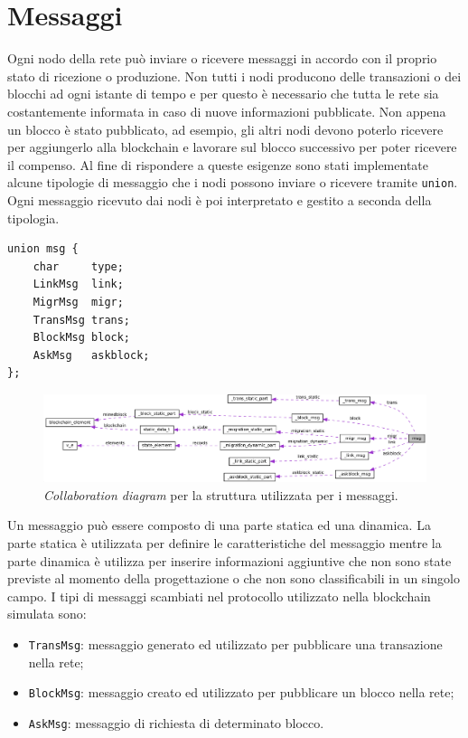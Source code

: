 \section{Messaggi}
Ogni nodo della rete può inviare o ricevere messaggi in accordo con il proprio stato di ricezione o produzione. Non tutti i nodi producono delle transazioni o dei blocchi ad ogni istante di tempo e per questo è necessario che tutta le rete sia costantemente informata in caso di nuove informazioni pubblicate. Non appena un blocco è stato pubblicato, ad esempio, gli altri nodi devono poterlo ricevere per aggiungerlo alla blockchain e lavorare sul blocco successivo per poter ricevere il compenso. Al fine di rispondere a queste esigenze sono stati implementate alcune tipologie di messaggio che i nodi possono inviare o ricevere tramite \texttt{union}. Ogni messaggio ricevuto dai nodi è poi interpretato e gestito a seconda della tipologia.
\begin{code}
\begin{verbatim}
union msg {
    char     type;
    LinkMsg  link;
    MigrMsg  migr;
    TransMsg trans;
    BlockMsg block;
    AskMsg   askblock;
};
\end{verbatim}
\end{code}
\begin{figure}[H]
    \centering
    \includegraphics[width=\textwidth]{images/collaboration_union_msg.png}
    \caption{\textit{Collaboration diagram} per la struttura utilizzata per i messaggi.}
\end{figure}
Un messaggio può essere composto di una parte statica ed una dinamica. La parte statica è utilizzata per definire le caratteristiche del messaggio mentre la parte dinamica è utilizza per inserire informazioni aggiuntive che non sono state previste al momento della progettazione o che non sono classificabili in un singolo campo.\newline
I tipi di messaggi scambiati nel protocollo utilizzato nella blockchain simulata sono:
\begin{itemize}
    \item \texttt{TransMsg}: messaggio generato ed utilizzato per pubblicare una transazione nella rete;
    \item \texttt{BlockMsg}: messaggio creato ed utilizzato per pubblicare un blocco nella rete;
    \item \texttt{AskMsg}: messaggio di richiesta di determinato blocco.
\end{itemize}
